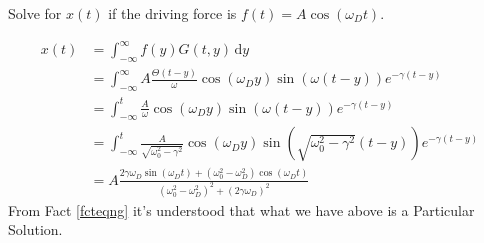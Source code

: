 \documentclass[10pt]{article}
\begin{document}
\begin{prob}
	Solve for $x(t)$ if the driving force is $f(t) = A \cos (\omega_D t)$.
\end{prob}
\begin{solu}
	\begin{align*}
		x(t) &= \int_{-\infty}^{\infty} f(y) G(t,y) \, \mathrm{d} y  \\
		     &=
		     \int_{-\infty}^{\infty} A \frac{\Theta(t-y)}{\omega}\cos(\omega_D y)\sin(\omega (t-y) ) e^{- \gamma (t - y)}  \\ 
		     &= 
		     \int_{-\infty}^{t}  \frac{A}{\omega}\cos(\omega_D y)\sin(\omega (t-y) ) e^{- \gamma (t - y)}  \\ 
		     &= 
		     \int_{-\infty}^{t}  \frac{A}{\sqrt{\omega_0^2 - \gamma^2} }\cos(\omega_D y)\sin(\sqrt{\omega_0^2 - \gamma^2}  (t-y) ) e^{- \gamma (t - y)}  
		     \tag{intentionally expanded}		     \\
		     &= 
A \frac{
2 \gamma \omega_D \sin\left(\omega_D t\right) + (\omega_0^2 - \omega_D^2) \cos(\omega_D t)
}{
	(\omega_0^2 - \omega_D^2)^2 + (2 \gamma \omega_D)^2
}
\tag{integral calculator assist}
	\end{align*}
	From Fact \ref{fcteqng} it's understood that what we have above is a Particular Solution. 
\end{solu}
\end{document}
